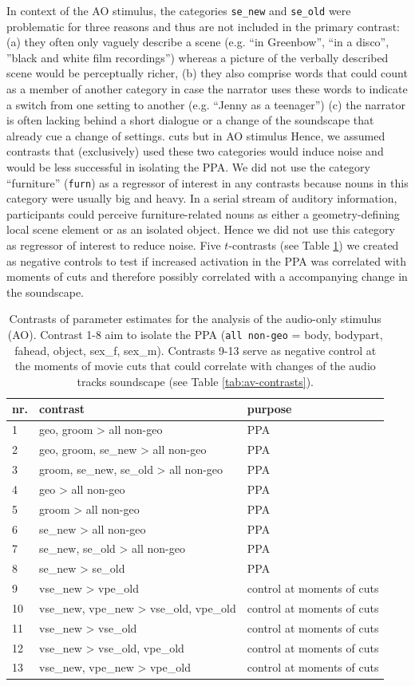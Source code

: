 \documentclass[english]{article}
\begin{document}
In context of the AO stimulus, the categories \texttt{se\_new} and
\texttt{se\_old} were problematic for three reasons and thus are not included in
the primary contrast:
(a) they often only vaguely describe a scene (e.g. ``in Greenbow'', ``in a
disco'', ''black and white film recordings'') whereas a picture of the verbally
described scene would be perceptually richer,
(b) they also comprise words that could count as a member of another category in
case the narrator uses these words to indicate a switch from one setting to
another (e.g. ``Jenny as a teenager'')
(c) the narrator is often lacking behind a short dialogue or a change of the
soundscape that already cue a change of settings.  cuts but in AO stimulus
Hence, we assumed contrasts that (exclusively) used these two categories would
induce noise and would be less successful in isolating the PPA.
We did not use the category ``furniture'' (\texttt{furn}) as a
regressor of interest in any contrasts because nouns in this category were
usually big and heavy. In a serial stream of auditory information, participants
could perceive furniture-related nouns as either a geometry-defining local scene
element or as an isolated object. Hence we did not use this category as
regressor of interest to reduce noise.
Five $t$-contrasts (see Table \ref{tab:ao-contrasts}) we created as negative
controls to test if increased activation in the PPA was correlated with
moments of cuts and therefore possibly correlated with a accompanying change in
the soundscape.


\begin{table}[t]
\caption{Contrasts of parameter estimates for the analysis of the audio-only
    stimulus (AO). Contrast 1-8 aim to isolate the PPA (\texttt{all non-geo} =
    body, bodypart, fahead, object, sex\_f, sex\_m).
    Contrasts 9-13 serve as negative control at the moments of movie cuts that
    could correlate with changes of the audio tracks soundscape (see Table
    \ref{tab:av-contrasts}).}
\label{tab:ao-contrasts}
\footnotesize
\begin{tabular}{lll}
\toprule
\textbf{nr.} &  \textbf{contrast} & \textbf{purpose} \\
\midrule
1 & geo, groom > all non-geo & PPA \tabularnewline
2 & geo, groom, se\_new > all non-geo & PPA \tabularnewline
3 & groom, se\_new, se\_old > all non-geo & PPA \tabularnewline
4 & geo > all non-geo & PPA \tabularnewline
5 & groom > all non-geo & PPA \tabularnewline
6 & se\_new > all non-geo & PPA \tabularnewline
7 & se\_new, se\_old > all non-geo & PPA \tabularnewline
8 & se\_new > se\_old & PPA \tabularnewline
9 & vse\_new > vpe\_old & control at moments of cuts \tabularnewline
10 & vse\_new, vpe\_new > vse\_old, vpe\_old & control at moments of cuts \tabularnewline
11 & vse\_new > vse\_old & control at moments of cuts \tabularnewline
12 & vse\_new > vse\_old, vpe\_old & control at moments of cuts \tabularnewline
13 & vse\_new, vpe\_new > vpe\_old & control at moments of cuts \tabularnewline
\end{tabular}
\end{table}
\end{document}
